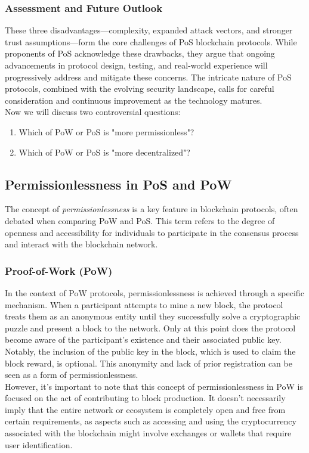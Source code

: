\subsubsection{Assessment and Future Outlook}
These three disadvantages—complexity, expanded attack vectors, and stronger trust assumptions—form the core challenges of PoS blockchain protocols. While proponents of PoS acknowledge these drawbacks, they argue that ongoing advancements in protocol design, testing, and real-world experience will progressively address and mitigate these concerns. The intricate nature of PoS protocols, combined with the evolving security landscape, calls for careful consideration and continuous improvement as the technology matures.\\

Now we will discuss two controversial questions:\\
\begin{enumerate}
    \item Which of PoW or PoS is "more permissionless"?
    \item Which of PoW or PoS is "more decentralized"?
\end{enumerate}
\subsection{Permissionlessness in PoS and PoW}
The concept of \textit{permissionlessness} is a key feature in blockchain protocols, often debated when comparing PoW and PoS. This term refers to the degree of openness and accessibility for individuals to participate in the consensus process and interact with the blockchain network.

\subsubsection{Proof-of-Work (PoW)}
In the context of PoW protocols, permissionlessness is achieved through a specific mechanism. When a participant attempts to mine a new block, the protocol treats them as an anonymous entity until they successfully solve a cryptographic puzzle and present a block to the network. Only at this point does the protocol become aware of the participant's existence and their associated public key. Notably, the inclusion of the public key in the block, which is used to claim the block reward, is optional. This anonymity and lack of prior registration can be seen as a form of permissionlessness.\\
However, it's important to note that this concept of permissionlessness in PoW is focused on the act of contributing to block production. It doesn't necessarily imply that the entire network or ecosystem is completely open and free from certain requirements, as aspects such as accessing and using the cryptocurrency associated with the blockchain might involve exchanges or wallets that require user identification.

